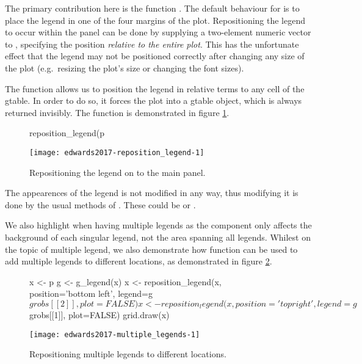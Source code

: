 The primary contribution here is the function .
The default behaviour for  is to place the legend in
one of the four margins of the plot. Repositioning the legend to occur
within the panel can be done by supplying a two-element numeric vector
to , specifying the position
\emph{relative to the entire plot}. This has the unfortunate effect that
the legend may not be positioned correctly after changing any size of
the plot (e.g.~resizing the plot's size or changing the font sizes).

The function  allows us to position the legend
in relative terms to any cell of the gtable. In order to do so, it
forces the plot into a gtable object, which is always returned
invisibly. The function is demonstrated in figure
\ref{fig:reposition_legend}.

\begin{figure}[hb!]

\begin{Sinput}
reposition_legend(p %+% aes(color=cyl), position = 'top right')
\end{Sinput}

\texttt{[image: edwards2017-reposition\_legend-1]} 
  \caption{Repositioning the legend on to the main panel.}
  \label{fig:reposition_legend}
\end{figure}

The appearences of the legend is not modified in any way, thus modifying
it is done by the usual methods of . These could be
 or .

We also highlight  when having
multiple legends as the component  only
affects the background of each singular legend, not the area spanning
all legends. Whilest on the topic of multiple legend, we also
demonstrate how  function can be used to add
multiple legends to different locations, as demonstrated in figure
\ref{fig:multiple_legends}.

\begin{figure}[h!]

\begin{Sinput}
x <- p %+% aes(color=cyl, size=qsec)
g <- g_legend(x)
x <- reposition_legend(x, position='bottom left', legend=g$grobs[[2]], plot=FALSE)
x <- reposition_legend(x, position='top right', legend=g$grobs[[1]], plot=FALSE)
grid.draw(x)
\end{Sinput}

\texttt{[image: edwards2017-multiple\_legends-1]} 
  \caption{Repositioning multiple legends to different locations.}
  \label{fig:multiple_legends}
\end{figure}

